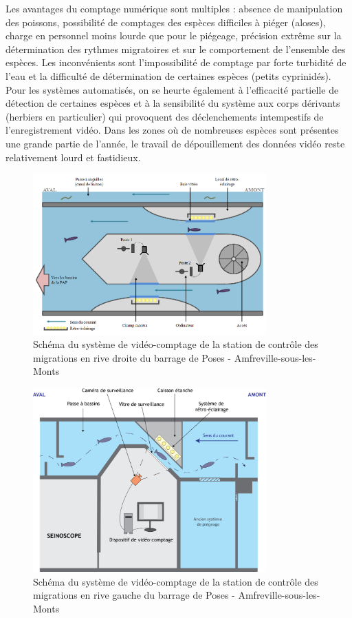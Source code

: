 \documentclass[11pt,titlepage,twoside]{article}\usepackage[]{graphicx}\usepackage[table]{xcolor}
\begin{document}
Les avantages du comptage numérique sont multiples : absence de manipulation des poissons, possibilité de comptages des espèces difficiles à piéger (aloses), charge en personnel moins lourde que pour le piégeage, précision extrême sur la détermination des rythmes migratoires et sur le comportement de l'ensemble des espèces. Les inconvénients sont l'impossibilité de comptage par forte turbidité de l'eau et la difficulté de détermination de certaines espèces (petits cyprinidés). Pour les systèmes automatisés, on se heurte également à l'efficacité partielle de détection de certaines espèces et à la sensibilité du système aux corps dérivants (herbiers en particulier) qui provoquent des déclenchements intempestifs de l'enregistrement vidéo. Dans les zones où de nombreuses espèces sont présentes une grande partie de l'année, le travail de dépouillement des données vidéo reste relativement lourd et fastidieux.

\begin{figure}
\centering
\includegraphics[width=0.8\textwidth]{vc_rd_poses}
\caption{Schéma du système de vidéo-comptage de la station de contrôle des migrations en rive droite du barrage de Poses - Amfreville-sous-les-Monts}
\label{vc_rd_poses}
\end{figure}

\begin{figure}
\centering
\includegraphics[width=0.8\textwidth]{vc_rg_poses}
\caption{Schéma du système de vidéo-comptage de la station de contrôle des migrations en rive gauche du barrage de Poses - Amfreville-sous-les-Monts}
\label{vc_rg_poses}
\end{figure}
\end{document}
